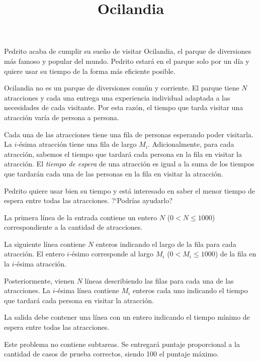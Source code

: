 \documentclass{oci}
\title{Ocilandia}
\begin{document}
\begin{problemDescription}
  Pedrito acaba de cumplir su sueño de visitar Ocilandia, el parque de diversiones más famoso y
  popular del mundo.
  Pedrito estará en el parque solo por un día y quiere usar su tiempo de la forma más eficiente posible.

  Ocilandia no es un parque de diversiones común y corriente.
  El parque tiene $N$ atracciones y cada una entrega una experiencia individual adaptada a
  las necesidades de cada visitante.
  Por esta razón, el tiempo que tarda visitar una atracción varía de persona a persona.

  Cada una de las atracciones tiene una fila de personas esperando poder visitarla.
  La $i$-ésima atracción tiene una fila de largo $M_i$.
  Adicionalmente, para cada atracción, sabemos el tiempo que tardará cada persona en la fila en
  visitar la atracción.
  El \emph{tiempo de espera} de una atracción es igual a la suma de los tiempos que tardarán
  cada una de las personas en la fila en visitar la atracción.

  Pedrito quiere usar bien su tiempo y está interesado en saber el menor tiempo de espera entre
  todas las atracciones.
  ?`Podrías ayudarlo?
\end{problemDescription}

\begin{inputDescription}
  La primera línea de la entrada contiene un entero $N$ ($0 < N \leq 1000$) correspondiente a la
  cantidad de atracciones.

  La siguiente línea contiene $N$ enteros indicando el largo de la fila para cada atracción.
  El entero $i$-ésimo corresponde al largo $M_i$ ($0 < M_i \leq 1000$) de la fila en la $i$-ésima atracción.

  Posteriormente, vienen $N$ líneas describiendo las filas para cada una de las atracciones.
  La $i$-ésima línea contiene $M_i$ enteros cada uno indicando el tiempo que tardará cada persona
  en visitar la atracción.
\end{inputDescription}

\begin{outputDescription}
  La salida debe contener una línea con un entero indicando el tiempo mínimo de espera entre todas
  las atracciones.
\end{outputDescription}

\begin{scoreDescription}
  Este problema no contiene subtareas.
  Se entregará puntaje proporcional a la cantidad de casos de prueba correctos,
  siendo 100 el puntaje máximo.
\end{scoreDescription}

\begin{sampleDescription}
\end{sampleDescription}
\end{document}
